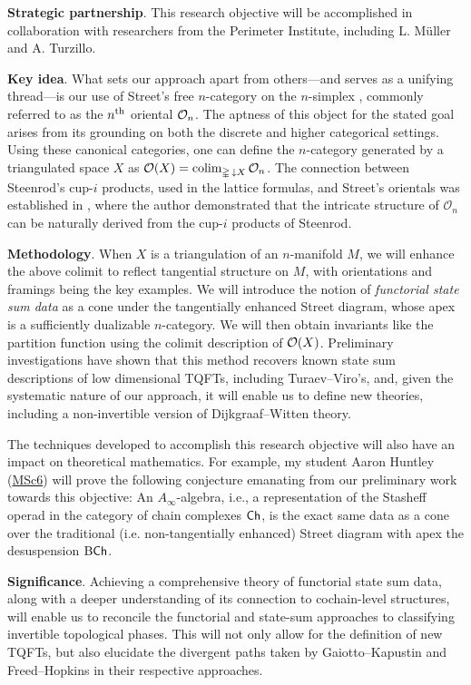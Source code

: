 \smallskip\noindent\textbf{Strategic partnership}.
This research objective will be accomplished in collaboration with researchers from the Perimeter Institute, including L. M\"uller and A. Turzillo.

\smallskip\noindent\textbf{Key idea}.
What sets our approach apart from others—and serves as a unifying thread—is our use of Street's free $n$-category on the $n$-simplex \cite{street1987orientals}, commonly referred to as the $n^{\mathrm{th}}$ oriental $\mathcal{O}_n$.
The aptness of this object for the stated goal arises from its grounding on both the discrete and higher categorical settings.
Using these canonical categories, one can define the $n$-category generated by a triangulated space $X$ as $\mathcal{O}(X) = \operatorname*{colim}_{\mathbb{\Delta}\, \downarrow X} \mathcal{O}_n$.
The connection between Steenrod's cup-$i$ products, used in the lattice formulas, and Street's orientals was established in \cite{medina2020globular}, where the author demonstrated that the intricate structure of $\mathcal{O}_n$ can be naturally derived from the cup-$i$ products of Steenrod.

\smallskip\noindent\textbf{Methodology}.
When $X$ is a triangulation of an $n$-manifold $M$, we will enhance the above colimit to reflect tangential structure on $M$, with orientations and framings being the key examples.
We will introduce the notion of \textit{functorial state sum data} as a cone under the tangentially enhanced Street diagram, whose apex is a sufficiently dualizable $n$-category.
We will then obtain invariants like the partition function using the colimit description of $\mathcal{O}(X)$.
Preliminary investigations have shown that this method recovers known state sum descriptions of low dimensional TQFTs, including Turaev--Viro's, and, given the systematic nature of our approach, it will enable us to define new theories, including a non-invertible version of Dijkgraaf--Witten theory.

\quad The techniques developed to accomplish this research objective will also have an impact on theoretical mathematics.
For example, my student Aaron Huntley (\underline{MSc6}) will prove the following conjecture emanating from our preliminary work towards this objective: An $A_\infty$-algebra, i.e., a representation of the Stasheff operad in the category of chain complexes $\mathsf{Ch}$, is the exact same data as a cone over the traditional (i.e. non-tangentially enhanced) Street diagram with apex the desuspension $\mathrm{B}\mathsf{Ch}$.

\smallskip\noindent\textbf{Significance}.
Achieving a comprehensive theory of functorial state sum data, along with a deeper understanding of its connection to cochain-level structures, will enable us to reconcile the functorial and state-sum approaches to classifying invertible topological phases.
This will not only allow for the definition of new TQFTs, but also elucidate the divergent paths taken by Gaiotto--Kapustin and Freed--Hopkins in their respective approaches.